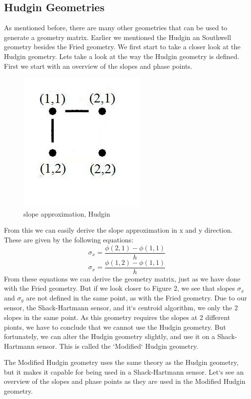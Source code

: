 \documentclass{article}
\begin{document}
\subsection{Hudgin Geometries}
As mentioned before, there are many other geometries that can be used to generate a geometry matrix. Earlier we mentioned the Hudgin an Southwell geometry besides the Fried geometry. We first start to take a closer look at the Hudgin geometry.
\newline
\newline
Lets take a look at the way the Hudgin geometry is defined. First we start with an overview of the slopes and phase points.
\begin{figure}[h!]
  \centering
  \includegraphics[scale=0.6]{figures/hudgin}
  \caption{slope approximation, Hudgin}
\end{figure}
From this we can easily derive the slope approximation in x and y direction. These are given by the following equations:
$$ \sigma_x = \frac{\phi(2,1)-\phi(1,1)}{h}$$
$$ \sigma_x = \frac{\phi(1,2)-\phi(1,1)}{h}$$
From these equations we can derive the geometry matrix, just as we have done with the Fried geometry. But if we look closer to Figure 2, we see that slopes $\sigma_x$ and $\sigma_y$ are not defined in the same point, as with the Fried geometry. Due to our sensor, the Shack-Hartmann sensor, and it`s centroid algorithm, we only the 2 slopes in the same point. As this geometry requires the slopes at 2 different pionts, we have to conclude that we cannot use the Hudgin geometry. But fortunately, we can alter the Hudgin geometry slightly, and use it on a Shack-Hartmann sensor. This is called the `Modified` Hudgin geometry\cite{rosensteiner2011cumulative}.

\newline
\newline
The Modified Hudgin geometry uses the same theory as the Hudgin geometry, but it makes it capable for being used in a Shack-Hartmann sensor. Let`s see an overview of the slopes and phase points as they are used in the Modified Hudgin geometry.  
\end{document}
